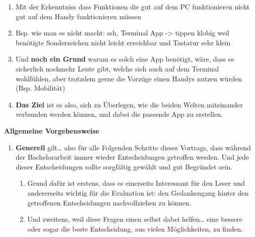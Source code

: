 {\begin{enumerate}
		\item Mit der Erkenntniss dass Funktionen die gut auf dem PC funktionieren nicht gut auf dem Handy funktionieren müssen 
		\item Bsp. wie man es nicht macht: ssh, Terminal App -> tippen klobig weil benötigte Sonderzeichen nicht leicht erreichbar und Tastatur sehr klein
		\item Und \textbf{noch ein Grund} warum es solch eine App benötigt, wäre, dass es sicherlich nochmehr Leute gibt, welche sich auch auf dem Terminal wohlfühlen, aber trotzdem gerne die Vorzüge einen Handys nutzen würden (Bsp. Mobilität)
		\item \textbf{Das Ziel} ist es also, sich zu Überlegen, wie die beiden Welten miteinander verbunden werden können, und dabei die passende App zu erstellen.
	\end{enumerate}
	
	
	
	\myNewSection
	\textbf{Allgemeine Vorgehensweise} \myCheckmark
	\begin{enumerate}
		\item \textbf{Generell} gilt… also für alle Folgenden Schritte dieses Vortrags, dass während der Bachelorarbeit immer wieder Entscheidungen getroffen werden. Und jede dieser Entscheidungen sollte sorgfältig gewählt und gut Begründet sein.
		\begin{enumerate}
			\item Grund dafür ist erstens, dass es einerseits Interessant für den Leser und andererseits wichtig für die Evaluation ist: den Gedankengang hinter den getroffenen Entscheidungen nachvollziehen zu können.
			\item Und zweitens, weil diese Fragen einen selbst dabei helfen… eine bessere oder sogar die beste Entscheidung, aus vielen Möglichkeiten, zu finden.
		\end{enumerate}
		

\end{enumerate}}
